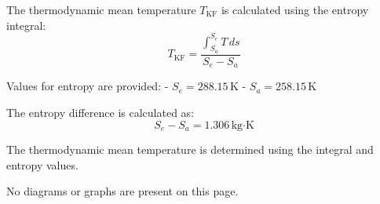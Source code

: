 The thermodynamic mean temperature \(T_{\text{KF}}\) is calculated using the entropy integral:  
\[
T_{\text{KF}} = \frac{\int_{S_a}^{S_e} T \, ds}{S_e - S_a}
\]  

Values for entropy are provided:  
- \(S_e = 288.15 \, \text{K}\)  
- \(S_a = 258.15 \, \text{K}\)  

The entropy difference is calculated as:  
\[
S_e - S_a = 1.306 \, \text{kg·K}
\]  

The thermodynamic mean temperature is determined using the integral and entropy values.  

No diagrams or graphs are present on this page.